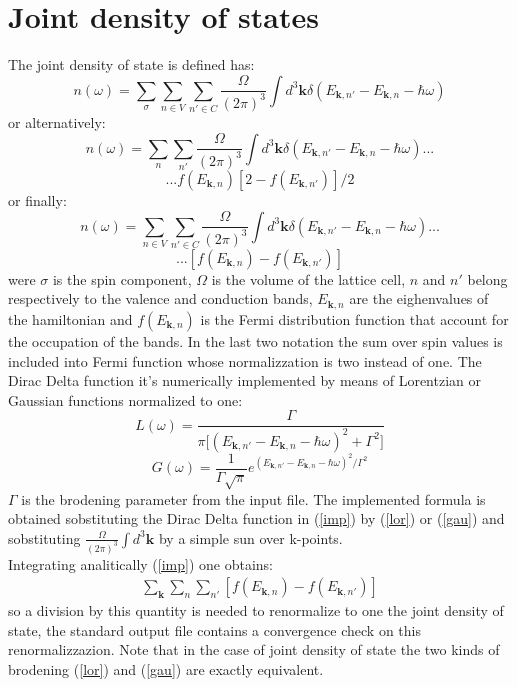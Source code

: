 \documentclass[twocolumn]{article}
\begin{document}
\section{Joint density of states}
The joint density of state is defined has:
\begin{displaymath}
n(\omega)=\sum_{\sigma}\sum_{n\in V}\sum_{n'\in C}\frac{\Omega}{(2\pi)^3}\int d^3\textbf{k}\delta(E_{\textbf{k},n'}-E_{\textbf{k},n}
-\hbar\omega)
\end{displaymath}
or alternatively:
\begin{equation}
n(\omega)=\sum_{n}\sum_{n'}\frac{\Omega}{(2\pi)^3}\int d^3\textbf{k}\delta(E_{\textbf{k},n'}-E_{\textbf{k},n}
-\hbar\omega)...
\label{imp2}
\end{equation}
\begin{displaymath}
...f(E_{\textbf{k},n})[2-f(E_{\textbf{k},n'})]/2
\end{displaymath}
or finally:
\begin{equation}
n(\omega)=\sum_{n\in V}\sum_{n'\in C}\frac{\Omega}{(2\pi)^3}\int d^3\textbf{k}\delta(E_{\textbf{k},n'}-E_{\textbf{k},n}
-\hbar\omega)...
\label{imp}
\end{equation}
\begin{displaymath}
...[f(E_{\textbf{k},n})-f(E_{\textbf{k},n'})]
\end{displaymath}
were $\sigma$ is the spin component, $\Omega$ is the volume of the lattice cell, $n$ and $n'$ belong respectively to the 
valence and conduction bands, 
$E_{\textbf{k},n}$ are the eighenvalues of the hamiltonian and $f(E_{\textbf{k},n})$ is the Fermi distribution function 
that account for the occupation of the bands. In the last two notation the sum over spin values is included into
Fermi function whose normalizzation is two instead of one.   
The Dirac Delta function it's numerically implemented by means of Lorentzian 
or Gaussian functions normalized to one:
\begin{equation}
L(\omega)=\frac{\Gamma}{\pi\big[(E_{\textbf{k},n'}-E_{\textbf{k},n}-\hbar\omega)^2+\Gamma^2\big]}
\label{lor}
\end{equation}
\begin{equation}
G(\omega)=\frac{1}{\Gamma\sqrt{\pi}}e^{(E_{\textbf{k},n'}-E_{\textbf{k},n}-\hbar\omega)^2/\Gamma^2}
\label{gau}
\end{equation}
$\Gamma$ is the brodening parameter from the input file. The implemented formula is obtained sobstituting the 
Dirac Delta function in (\ref{imp}) by (\ref{lor}) or (\ref{gau}) and sobstituting $\frac{\Omega}{(2\pi)^3}\int 
d^3\textbf{k}$ by a simple sun over k-points.\\
Integrating analitically (\ref{imp}) one obtains: 
\begin{eqnarray}
\sum_{\textbf{k}}\sum_{n}\sum_{n'}[f(E_{\textbf{k},n})-f(E_{\textbf{k},n'})]
\end{eqnarray}
so a division by this quantity is needed to renormalize to one the joint density of state, the standard output file 
contains a convergence check on this renormalizzazion. Note that in the case of 
joint density of state the two kinds of brodening (\ref{lor}) and (\ref{gau}) are exactly equivalent.
\end{document}
